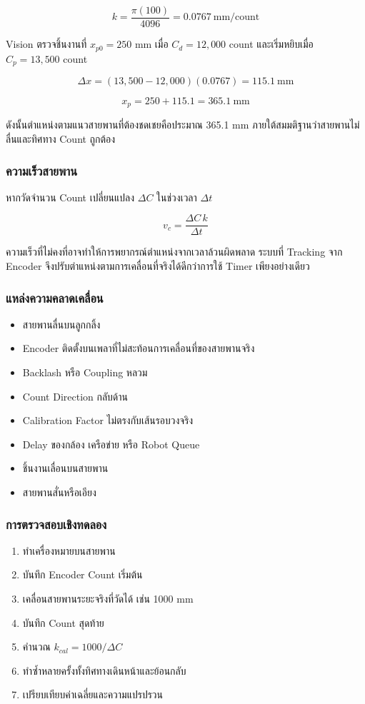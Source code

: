 \[
k=\frac{\pi(100)}{4096}=0.0767\ \text{mm/count}
\]

Vision ตรวจชิ้นงานที่ $x_{p0}=250$ mm เมื่อ $C_d=12{,}000$ count และเริ่มหยิบเมื่อ $C_p=13{,}500$ count

\[
\Delta x=(13{,}500-12{,}000)(0.0767)=115.1\ \text{mm}
\]

\[
x_p=250+115.1=365.1\ \text{mm}
\]

ดังนั้นตำแหน่งตามแนวสายพานที่ต้องชดเชยคือประมาณ 365.1 mm ภายใต้สมมติฐานว่าสายพานไม่ลื่นและทิศทาง Count ถูกต้อง

\subsubsection{ความเร็วสายพาน}

หากวัดจำนวน Count เปลี่ยนแปลง $\Delta C$ ในช่วงเวลา $\Delta t$

\[
v_c=\frac{\Delta C\,k}{\Delta t}
\]

ความเร็วที่ไม่คงที่อาจทำให้การพยากรณ์ตำแหน่งจากเวลาล้วนผิดพลาด ระบบที่ Tracking จาก Encoder จึงปรับตำแหน่งตามการเคลื่อนที่จริงได้ดีกว่าการใช้ Timer เพียงอย่างเดียว

\subsubsection{แหล่งความคลาดเคลื่อน}

\begin{itemize}
    \item สายพานลื่นบนลูกกลิ้ง
    \item Encoder ติดตั้งบนเพลาที่ไม่สะท้อนการเคลื่อนที่ของสายพานจริง
    \item Backlash หรือ Coupling หลวม
    \item Count Direction กลับด้าน
    \item Calibration Factor ไม่ตรงกับเส้นรอบวงจริง
    \item Delay ของกล้อง เครือข่าย หรือ Robot Queue
    \item ชิ้นงานเลื่อนบนสายพาน
    \item สายพานสั่นหรือเอียง
\end{itemize}

\subsubsection{การตรวจสอบเชิงทดลอง}

\begin{enumerate}
    \item ทำเครื่องหมายบนสายพาน
    \item บันทึก Encoder Count เริ่มต้น
    \item เคลื่อนสายพานระยะจริงที่วัดได้ เช่น 1000 mm
    \item บันทึก Count สุดท้าย
    \item คำนวณ $k_{cal}=1000/\Delta C$
    \item ทำซ้ำหลายครั้งทั้งทิศทางเดินหน้าและย้อนกลับ
    \item เปรียบเทียบค่าเฉลี่ยและความแปรปรวน
\end{enumerate}

